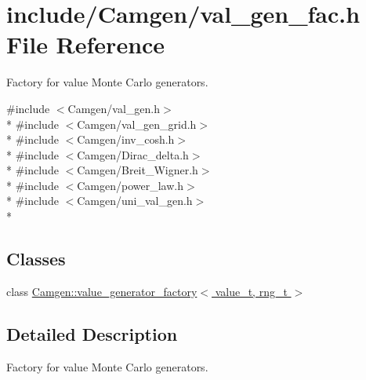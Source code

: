 \hypertarget{a00829}{}\section{include/\+Camgen/val\+\_\+gen\+\_\+fac.h File Reference}
\label{a00829}


Factory for value Monte Carlo generators.  


{\ttfamily \#include $<$Camgen/val\+\_\+gen.\+h$>$}\\*
{\ttfamily \#include $<$Camgen/val\+\_\+gen\+\_\+grid.\+h$>$}\\*
{\ttfamily \#include $<$Camgen/inv\+\_\+cosh.\+h$>$}\\*
{\ttfamily \#include $<$Camgen/\+Dirac\+\_\+delta.\+h$>$}\\*
{\ttfamily \#include $<$Camgen/\+Breit\+\_\+\+Wigner.\+h$>$}\\*
{\ttfamily \#include $<$Camgen/power\+\_\+law.\+h$>$}\\*
{\ttfamily \#include $<$Camgen/uni\+\_\+val\+\_\+gen.\+h$>$}\\*
\subsection*{Classes}
\begin{DoxyCompactItemize}
\item 
class \hyperlink{a00578}{Camgen\+::value\+\_\+generator\+\_\+factory$<$ value\+\_\+t, rng\+\_\+t $>$}
\end{DoxyCompactItemize}


\subsection{Detailed Description}
Factory for value Monte Carlo generators. 

